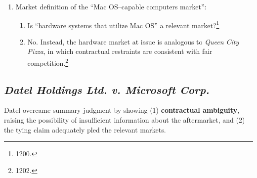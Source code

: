 \begin{enumerate}
\begin{enumerate}
        competition.\footnote{1198--1200.}
        \item \textbf{``~.~.~.~the counterclaim does not plausibly allege that 
        Mac OS is an independent market.''}\footnote{1200.}
    \end{enumerate}
    \item Market definition of the ``Mac OS--capable computers market'':
    \begin{enumerate}
        \item Is ``hardware systems that utilize Mac OS'' a relevant 
        market?\footnote{1200.}
        \item No. Instead, the hardware market at issue is analogous to 
        \emph{Queen City Pizza}, in which contractual restraints are 
        consistent with fair competition.\footnote{1202.}
    \end{enumerate}
\end{enumerate}

\subsection{\emph{Datel Holdings Ltd. v. Microsoft Corp.}}

Datel overcame summary judgment by showing (1) \textbf{contractual 
ambiguity}, raising the possibility of insufficient information about the 
aftermarket, and (2) the tying claim adequately pled the relevant markets.

